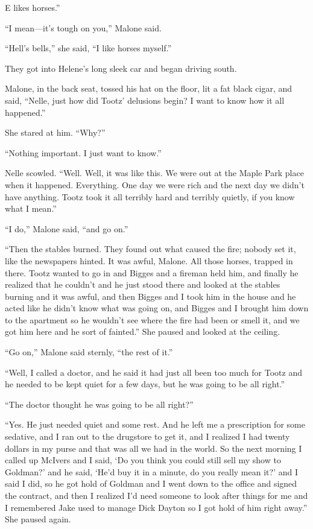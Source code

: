 \documentclass{novel}
\begin{document}
E likes horses.”

“I mean—it’s tough on you,” Malone said.

“Hell’s bells,” she said, “I like horses myself.”

They got into Helene’s long sleek car and began driving south.

Malone, in the back seat, tossed his hat on the floor, lit a fat black cigar, and said, “Nelle, just how did Tootz’ delusions begin? I want to know how it all happened.”

She stared at him. “Why?”

“Nothing important. I just want to know.”

Nelle scowled. “Well. Well, it was like this. We were out at the Maple Park place when it happened. Everything. One day we were rich and the next day we didn’t have anything. Tootz took it all terribly hard and terribly quietly, if you know what I mean.”

“I do,” Malone said, “and go on.”

“Then the stables burned. They found out what caused the fire; nobody set it, like the newspapers hinted. It was awful, Malone. All those horses, trapped in there. Tootz wanted to go in and Bigges and a fireman held him, and finally he realized that he couldn’t and he just stood there and looked at the stables burning and it was awful, and then Bigges and I took him in the house and he acted like he didn’t know what was going on, and Bigges and I brought him down to the apartment so he wouldn’t see where the fire had been or smell it, and we got him here and he sort of fainted.” She paused and looked at the ceiling.

“Go on,” Malone said sternly, “the rest of it.”

“Well, I called a doctor, and he said it had just all been too much for Tootz and he needed to be kept quiet for a few days, but he was going to be all right.”

“The doctor thought he was going to be all right?”

“Yes. He just needed quiet and some rest. And he left me a prescription for some sedative, and I ran out to the drugstore to get it, and I realized I had twenty dollars in my purse and that was all we had in the world. So the next morning I called up McIvers and I said, ‘Do you think you could still sell my show to Goldman?’ and he said, ‘He’d buy it in a minute, do you really mean it?’ and I said I did, so he got hold of Goldman and I went down to the office and signed the contract, and then I realized I’d need someone to look after things for me and I remembered Jake used to manage Dick Dayton so I got hold of him right away.” She paused again.
\end{document}
